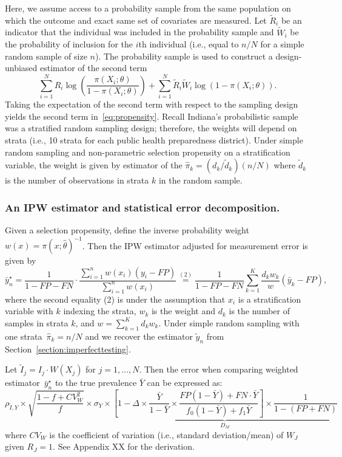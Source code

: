 \documentclass[11pt]{amsart}
\begin{document}
Here, we assume access to a probability sample from the same population on which the outcome and exact same set of covariates are measured.  Let $\tilde R_i$ be an indicator that the individual was included in the probability sample and $\tilde W_i$ be the probability of inclusion for the $i$th individual (i.e., equal to $n/N$ for a simple random sample of size $n$). The probability sample is used to construct a design-unbiased estimator of the second term
$$
\sum_{i=1}^N R_i \log \left( \frac{\pi (X_i; \theta)}{1-\pi(X_i; \theta)} \right)  + \sum_{i=1}^N \tilde R_i \tilde W_i \log ( 1 - \pi (X_i; \theta)).
$$
Taking the expectation of the second term with respect to the sampling design yields the second term in~\eqref{eq:propensity}.  Recall Indiana's probabilistic sample was a stratified random sampling design; therefore, the weights will depend on strata (i.e., 10 strata for each public health preparedness district).  Under simple random sampling and non-parametric selection propensity on a stratification variable, the weight is given by estimator of the $\hat \pi_k = (d_k / \tilde d_k) (n / N)$ where $\tilde d_k$ is the number of observations in strata $k$ in the random sample.

\subsubsection{An IPW estimator and statistical error decomposition.}
Given a selection propensity, define the inverse probability weight~$w(x) = \pi (x; \hat \theta)^{-1}$. Then the IPW estimator adjusted for measurement error is given by
$$
\bar y_n^\star
= \frac{1}{1-FP-FN} \cdot \frac{\sum_{i=1}^n w(x_i) (y_i - FP)}{\sum_{i=1}^n w (x_i)}
\stackrel{(2)}{=} \frac{1}{1-FP-FN} \sum_{k=1}^K \frac{d_k w_k}{w} (\bar y_k - FP),
$$
where the second equality (2) is under the assumption that $x_i$ is a stratification variable with $k$ indexing the strata, $w_k$ is the weight and $d_k$ is the number of samples in strata $k$, and $w = \sum_{k=1}^K d_k w_k$. Under simple random sampling with one strata~$\hat \pi_k = n/N$ and we recover the estimator $\tilde y_n$ from Section~\ref{section:imperfecttesting}.

Let $\tilde I_j = I_j  \cdot W(X_j)$ for $j=1,\ldots,N$.  Then the error when comparing weighted estimator~$\bar y_n^\star$ to the true prevalence $\bar Y$ can be expressed as:
$$
\rho_{\tilde I, Y} \times \sqrt{\frac{1-f+ CV^2_W}{f}} \times \sigma_{Y} \times \underbrace{\left[ 1 - \Delta \times \frac{\bar Y}{1-\bar Y} \times \frac{FP(1-\bar Y) + FN \cdot \bar Y}{f_0 (1-\bar Y) + f_1 \bar Y} \right] \times \frac{1}{1-(FP+FN)}}_{D_M}
$$
where $CV_W$ is the coefficient of variation (i.e., standard deviation/mean) of $W_J$ given $R_J = 1$.  See Appendix XX for the derivation.
\end{document}
